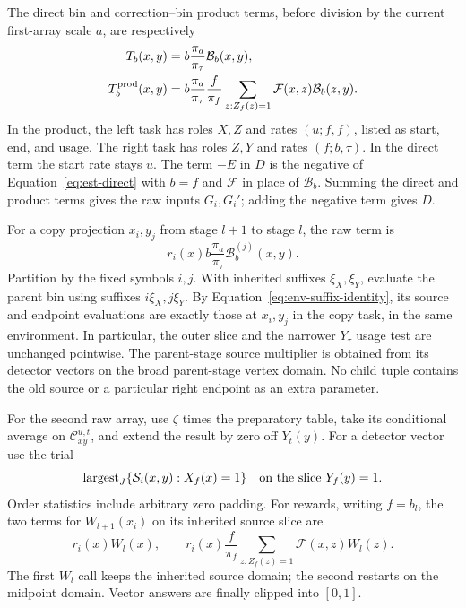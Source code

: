 The direct bin and correction--bin product terms, before division by
the current first-array scale $a$, are respectively
\begin{align}
 T_b(x,y)&=b\frac{\pi_a}{\pi_\tau}\mathcal B_b(x,y),
 \label{eq:est-direct}\\
 T_b^{\rm prod}(x,y)&=
 b\frac{\pi_a}{\pi_\tau}\frac f{\pi_f}
 \sum_{z:Z_f(z)=1}\mathcal F(x,z)\mathcal B_b(z,y).
 \label{eq:est-product}
\end{align}
In the product, the left task has roles $X,Z$ and rates
$(u;f,f)$, listed as start, end, and usage.  The right task has roles
$Z,Y$ and rates $(f;b,\tau)$.  In the direct term the start rate stays $u$.
The term $-E$ in $D$ is the negative of
Equation~\eqref{eq:est-direct} with $b=f$ and $\mathcal F$ in place of
$\mathcal B_b$.  Summing the direct and product terms gives the raw inputs
$G_i,G_i'$; adding the negative term gives $D$.

For a copy projection $x_i,y_j$ from stage $l+1$ to stage $l$, the raw term
is
\begin{equation}
 r_i(x)b\frac{\pi_a}{\pi_\tau}\mathcal B_b^{(j)}(x,y).
 \label{eq:est-projection}
\end{equation}
Partition by the fixed symbols $i,j$.  With inherited suffixes
$\xi_X,\xi_Y$, evaluate the parent bin using suffixes $i\xi_X,j\xi_Y$.
By Equation~\eqref{eq:env-suffix-identity}, its source and endpoint
evaluations are exactly those at $x_i,y_j$ in the copy task, in the
same environment.  In particular, the outer slice and the narrower
$Y_\tau$ usage test are unchanged pointwise.
The parent-stage source multiplier is obtained from its detector vectors
on the broad parent-stage vertex domain.  No child tuple contains the old
source or a particular right endpoint as an extra parameter.

For the second raw array, use $\zeta$ times the preparatory table, take
its conditional average on $\mathcal C_{xy}^{u,t}$, and extend the result
by zero off $Y_t(y)$.  For a detector vector use the trial
\begin{equation}
 \operatorname{largest}_{J}
       \{\mathcal S_i(x,y):X_f(x)=1\}
 \quad\hbox{on the slice }Y_f(y)=1.
 \label{eq:est-detector}
\end{equation}
Order statistics include arbitrary zero padding.  For rewards, writing $f=b_l$, the
two terms for $W_{l+1}(x_i)$ on its inherited source slice are
\begin{equation}
 r_i(x)W_l(x),\qquad
 r_i(x)\frac f{\pi_f}
       \sum_{z:Z_f(z)=1}\mathcal F(x,z)W_l(z).
 \label{eq:est-reward}
\end{equation}
The first $W_l$ call keeps the inherited source domain; the second restarts
on the midpoint domain.  Vector answers are finally clipped into $[0,1]$.

